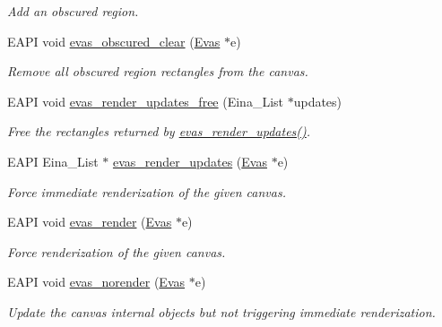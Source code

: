 \begin{DoxyCompactItemize}
\begin{DoxyCompactList}\small\item\em Add an obscured region. \item\end{DoxyCompactList}\item 
EAPI void \hyperlink{group__Evas__Canvas_ga76dbc1ce160666ffde45901346cfe876}{evas\_\-obscured\_\-clear} (\hyperlink{group__Evas__Canvas_ga5ff87cc4ce6bc43e3b640a6d37f73043}{Evas} $\ast$e)
\begin{DoxyCompactList}\small\item\em Remove all obscured region rectangles from the canvas. \item\end{DoxyCompactList}\item 
EAPI void \hyperlink{group__Evas__Canvas_gae4889bb5ec0e6e4f6ce5d6ef99f8737b}{evas\_\-render\_\-updates\_\-free} (Eina\_\-List $\ast$updates)
\begin{DoxyCompactList}\small\item\em Free the rectangles returned by \hyperlink{group__Evas__Canvas_ga49650dcc731a151d4881106b56f7a5ca}{evas\_\-render\_\-updates()}. \item\end{DoxyCompactList}\item 
EAPI Eina\_\-List $\ast$ \hyperlink{group__Evas__Canvas_ga49650dcc731a151d4881106b56f7a5ca}{evas\_\-render\_\-updates} (\hyperlink{group__Evas__Canvas_ga5ff87cc4ce6bc43e3b640a6d37f73043}{Evas} $\ast$e)
\begin{DoxyCompactList}\small\item\em Force immediate renderization of the given canvas. \item\end{DoxyCompactList}\item 
EAPI void \hyperlink{group__Evas__Canvas_ga241869ebb085b8ab11ff6af26e1aeaaf}{evas\_\-render} (\hyperlink{group__Evas__Canvas_ga5ff87cc4ce6bc43e3b640a6d37f73043}{Evas} $\ast$e)
\begin{DoxyCompactList}\small\item\em Force renderization of the given canvas. \item\end{DoxyCompactList}\item 
EAPI void \hyperlink{group__Evas__Canvas_ga5c7761185381376e2d97497625a7bbe1}{evas\_\-norender} (\hyperlink{group__Evas__Canvas_ga5ff87cc4ce6bc43e3b640a6d37f73043}{Evas} $\ast$e)
\begin{DoxyCompactList}\small\item\em Update the canvas internal objects but not triggering immediate renderization. \item\end{DoxyCompactList}\item 

\end{DoxyCompactItemize}
